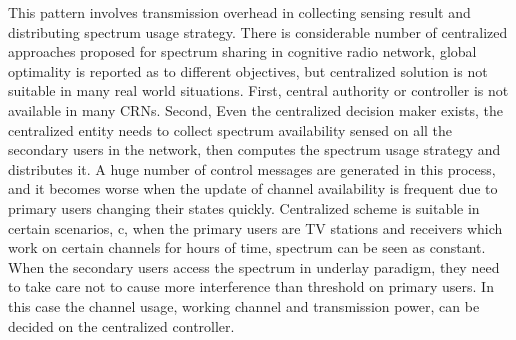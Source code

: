 This pattern involves transmission overhead in collecting sensing result and distributing spectrum usage strategy.
There is considerable number of centralized approaches proposed for spectrum sharing in cognitive radio network, global optimality is reported as to different objectives, but centralized solution is not suitable in many real world situations.
First, central authority or controller is not available in many CRNs.
Second, Even the centralized decision maker exists, the centralized entity needs to collect spectrum availability sensed on all the secondary users in the network, then computes the spectrum usage strategy and distributes it.
A huge number of control messages are generated in this process, and it becomes worse when the update of channel availability is frequent due to primary users changing their states quickly.
Centralized scheme is suitable in certain scenarios, c, \eg when the primary users are TV stations and receivers which work on certain channels for hours of time, spectrum can be seen as constant. 
When the secondary users access the spectrum in underlay paradigm, they need to take care not to cause more interference than threshold on primary users.
In this case the channel usage, \ie working channel and transmission power, can be decided on the centralized controller.


